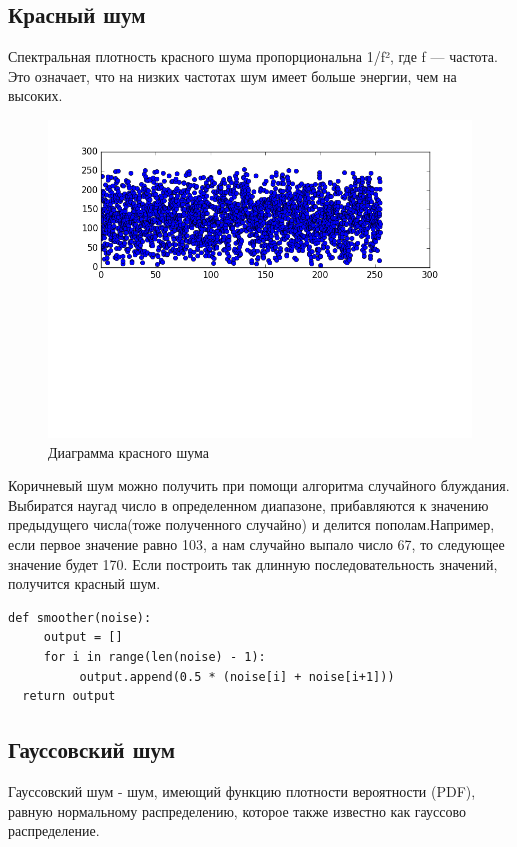 \subsection{Красный шум}
Спектральная плотность красного шума пропорциональна 1/f², где f — частота. Это означает, что на низких частотах шум имеет больше энергии, чем на высоких.																									\begin{figure}[h]
	\centering
 \includegraphics[width=\textwidth ]{img/3_red_noise.png}
	\caption{Диаграмма красного шума }
	\label{fig:spire04}
\end{figure} 
Коричневый шум можно получить при помощи алгоритма случайного блуждания. Выбиратся наугад число в определенном диапазоне,
  прибавляются к значению предыдущего числа(тоже полученного случайно) и делится пополам.Например, если первое значение равно 103, а нам случайно выпало число 67, то следующее значение будет 170. Если  построить так длинную последовательность значений, получится красный шум. 
  \begin{lstlisting}[style=pseudocode,caption={Получение коричневого шума}] 
  def smoother(noise):
     output = []
     for i in range(len(noise) - 1):
          output.append(0.5 * (noise[i] + noise[i+1]))
  return output
  \end{lstlisting}
 \subsection{Гауссовский шум}
 
 Гауссовский шум  - шум, имеющий функцию плотности вероятности (PDF), равную нормальному распределению, которое также известно как гауссово распределение. 

